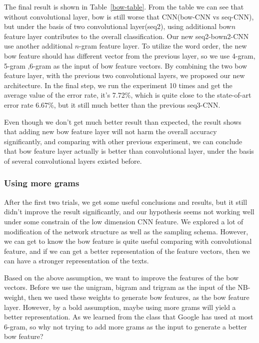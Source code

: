 The final result is shown in Table~\ref{bow-table}. From the table we can see that without convolutional layer,
bow is still worse that CNN(bow-CNN vs seq-CNN), but under the basis of two convolutional layer(seq2), using additional
bow$n$ feature layer contributes to the overall classification. Our new seq2-bow{n}2-CNN use another additional $n$-gram
feature layer. To utilize the word order, the new bow feature should has different vector from the previous layer, so we
use 4-gram, 5-gram ,6-gram as the input of bow feature vectors. By combining the two bow feature layer, 
with the previous two convolutional layers, we proposed our new architecture. In the final step, we run the experiment 10
times and get the average value of the error rate, it's 7.72\%, which is quite close to the state-of-art error rate 6.67\%,
but it still much better than the previous seq3-CNN.

Even though we don't get much better result than expected, the result shows that adding new bow feature layer will not harm
the overall accuracy significantly, and comparing with other previous experiment, we can conclude that bow feature layer
actually is better than convolutional layer, under the basis of several convolutional layers existed before.


\subsubsection{Using more grams}
After the first two trials, we get some useful conclusions and results, but it still didn't improve the result significantly,
and our hypothesis seems not working well under some constrain of the low dimension CNN feature. We explored a lot of modification
of the network structure as well as the sampling schema. However, we can get to know the bow feature is quite useful comparing
with convolutional feature, and if we can get a better representation of the feature vectors, then we can have a stronger
representation of the texts.

Based on the above assumption, we want to improve the features of the bow vectors. Before we use the unigram, bigram and trigram
as the input of the NB-weight, then we used these weights to generate bow features, as the bow feature layer. However, by a bold
assumption, maybe using more grams will yield a better representation. As we learned from the class that Google has used at most
6-gram, so why not trying to add more grams as the input to generate a better bow feature?

